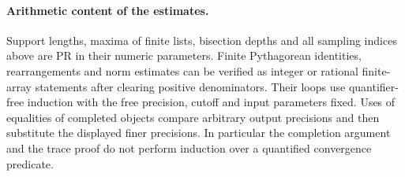 \paragraph{Arithmetic content of the estimates.}
Support lengths, maxima of finite lists, bisection depths and all sampling
indices above are PR in their numeric parameters. Finite Pythagorean
identities, rearrangements and norm estimates can be verified as
integer or rational finite-array statements after clearing positive
denominators. Their loops use quantifier-free induction with the free
precision, cutoff and input parameters fixed. Uses of equalities of
completed objects compare arbitrary output precisions and then substitute
the displayed finer precisions. In particular the completion argument
and the trace proof do not perform induction over a quantified
convergence predicate.
